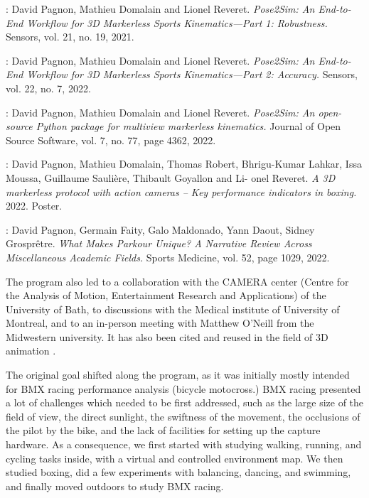 \noindent\cite{Pagnon2021}: David Pagnon, Mathieu Domalain and Lionel Reveret. \textit{Pose2Sim: An
End-to-End Workflow for 3D Markerless Sports Kinematics—Part 1:
Robustness.} Sensors, vol. 21, no. 19, 2021.

\noindent\cite{Pagnon2022a}: David Pagnon, Mathieu Domalain and Lionel Reveret. \textit{Pose2Sim: An
End-to-End Workflow for 3D Markerless Sports Kinematics—Part 2:
Accuracy.} Sensors, vol. 22, no. 7, 2022.

\noindent\cite{Pagnon2022b}: David Pagnon, Mathieu Domalain and Lionel Reveret. \textit{Pose2Sim:
An open-source Python package for multiview markerless kinematics.}
Journal of Open Source Software, vol. 7, no. 77, page 4362, 2022.

\noindent\cite{Pagnon2022c}: David Pagnon, Mathieu Domalain, Thomas Robert, Bhrigu-Kumar
Lahkar, Issa Moussa, Guillaume Saulière, Thibault Goyallon and Li-
onel Reveret. \textit{A 3D markerless protocol with action cameras – Key
performance indicators in boxing.} 2022. Poster.

\noindent\cite{Pagnon2022d}: David Pagnon, Germain Faity, Galo Maldonado, Yann Daout, Sidney Grosprêtre. \textit{What Makes Parkour Unique? A Narrative Review Across Miscellaneous Academic Fields.} Sports Medicine, vol. 52, page 1029, 2022.

The program also led to a collaboration with the CAMERA center (Centre for the Analysis of Motion, Entertainment Research and Applications) of the University of Bath, to discussions with the Medical institute of University of Montreal, and to an in-person meeting with Matthew O'Neill from the Midwestern university. It has also been cited and reused in the field of 3D animation \cite{Barreto2022}. 

\vspace*{0.5cm}

The original goal shifted along the program, as it was initially mostly intended for BMX racing performance analysis (bicycle motocross.) BMX racing presented a lot of challenges which needed to be first addressed, such as the large size of the field of view, the direct sunlight, the swiftness of the movement, the occlusions of the pilot by the bike, and the lack of facilities for setting up the capture hardware. As a consequence, we first started with studying walking, running, and cycling tasks inside, with a virtual and controlled environment map. We then studied boxing, did a few experiments with balancing, dancing, and swimming, and finally moved outdoors to study BMX racing.

